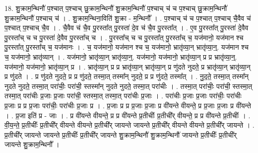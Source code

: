 \documentclass[17pt]{extarticle}
\begin{document}
18. शु॒क्राम॒न्थिनौ॑ प॒श्चात् प॒श्चाच् छु॒क्राम॒न्थिनौ॑ शु॒क्राम॒न्थिनौ॑ प॒श्चाच् च॑ च प॒श्चाच् छु॒क्राम॒न्थिनौ॑ शु॒क्राम॒न्थिनौ॑ प॒श्चाच् च॑ । . शु॒क्राम॒न्थिना॒विति॑ शु॒क्रा - म॒न्थिनौ᳚ । . प॒श्चाच् च॑ च प॒श्चात् प॒श्चाच् चै॒वैव च॑ प॒श्चात् प॒श्चाच् चै॒व । . चै॒वैव च॑ चै॒व पु॒रस्ता᳚त् पु॒रस्ता॑ दे॒व च॑ चै॒व पु॒रस्ता᳚त् । . ए॒व पु॒रस्ता᳚त् पु॒रस्ता॑ दे॒वैव पु॒रस्ता᳚च् च च पु॒रस्ता॑ दे॒वैव पु॒रस्ता᳚च् च । . पु॒रस्ता᳚च् च च पु॒रस्ता᳚त् पु॒रस्ता᳚च् च॒ यज॑मानो॒ यज॑मान श्च पु॒रस्ता᳚त् पु॒रस्ता᳚च् च॒ यज॑मानः । . च॒ यज॑मानो॒ यज॑मान श्च च॒ यज॑मानो॒ भ्रातृ॑व्या॒न् भ्रातृ॑व्या॒न्॒. यज॑मान श्च च॒ यज॑मानो॒ भ्रातृ॑व्यान् । . यज॑मानो॒ भ्रातृ॑व्या॒न् भ्रातृ॑व्या॒न्॒. यज॑मानो॒ यज॑मानो॒ भ्रातृ॑व्या॒न् प्र प्र भ्रातृ॑व्या॒न्॒. यज॑मानो॒ यज॑मानो॒ भ्रातृ॑व्या॒न् प्र । . भ्रातृ॑व्या॒न् प्र प्र भ्रातृ॑व्या॒न् भ्रातृ॑व्या॒न् प्र णु॑दते नुदते॒ प्र भ्रातृ॑व्या॒न् भ्रातृ॑व्या॒न् प्र णु॑दते । . प्र णु॑दते नुदते॒ प्र प्र णु॑दते॒ तस्मा॒त् तस्मा᳚न् नुदते॒ प्र प्र णु॑दते॒ तस्मा᳚त् । . नु॒द॒ते॒ तस्मा॒त् तस्मा᳚न् नुदते नुदते॒ तस्मा॒त् परा॑चीः॒ परा॑ची॒ स्तस्मा᳚न् नुदते नुदते॒ तस्मा॒त् परा॑चीः । . तस्मा॒त् परा॑चीः॒ परा॑ची॒ स्तस्मा॒त् तस्मा॒त् परा॑चीः प्र॒जाः प्र॒जाः परा॑ची॒ स्तस्मा॒त् तस्मा॒त् परा॑चीः प्र॒जाः । . परा॑चीः प्र॒जाः प्र॒जाः परा॑चीः॒ परा॑चीः प्र॒जाः प्र प्र प्र॒जाः परा॑चीः॒ परा॑चीः प्र॒जाः प्र । . प्र॒जाः प्र प्र प्र॒जाः प्र॒जाः प्र वी॑यन्ते वीयन्ते॒ प्र प्र॒जाः प्र॒जाः प्र वी॑यन्ते । . प्र॒जा इति॑ प्र - जाः । . प्र वी॑यन्ते वीयन्ते॒ प्र प्र वी॑यन्ते प्र॒तीचीः᳚ प्र॒तीची᳚र् वीयन्ते॒ प्र प्र वी॑यन्ते प्र॒तीचीः᳚ । . वी॒य॒न्ते॒ प्र॒तीचीः᳚ प्र॒तीची᳚र् वीयन्ते वीयन्ते प्र॒तीची᳚र् जायन्ते जायन्ते प्र॒तीची᳚र् वीयन्ते वीयन्ते प्र॒तीची᳚र् जायन्ते । . प्र॒तीची᳚र् जायन्ते जायन्ते प्र॒तीचीः᳚ प्र॒तीची᳚र् जायन्ते शु॒क्राम॒न्थिनौ॑ शु॒क्राम॒न्थिनौ॑ जायन्ते प्र॒तीचीः᳚ प्र॒तीची᳚र् जायन्ते शु॒क्राम॒न्थिनौ᳚ । \newline
\end{document}
